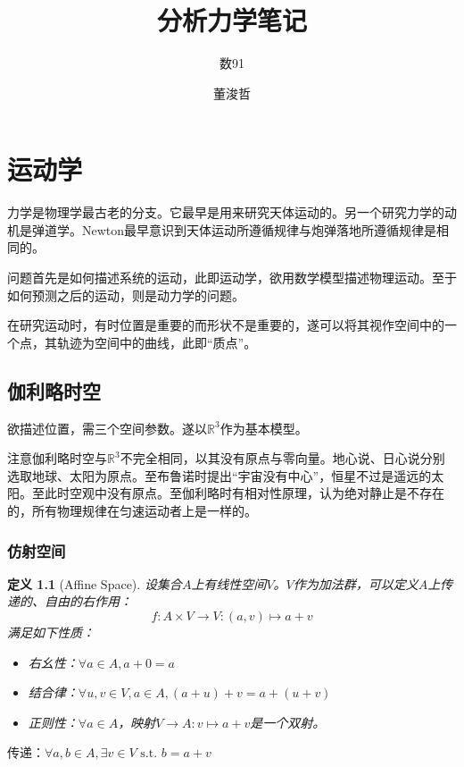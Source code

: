 \documentclass{ctexbook}
\title{分析力学笔记}
\author{数91\and 董浚哲}
\begin{document}
\maketitle

\newcommand{\A}{\mathbb{A}}
\newcommand{\R}{\mathbb{R}}
\newcommand{\N}{\mathbb{N}}
\newcommand{\dd}{\,\mathrm{d}}
\newcommand{\st}{\text{ s.t. }}
\newcommand{\pp}[2]{\frac{\partial #1}{\partial #2}}
\newcommand{\dif}[2]{\frac{\mathrm{d}#1}{\mathrm{d}#2}}
\newcommand{\nm}[1]{\left\|#1\right\|}
\newcommand{\dual}[1]{\left<#1\right>}
\newcommand{\wto}{\rightharpoonup}
\newcommand{\wsto}{\stackrel{*}{\rightharpoonup}}
\newcommand{\cvin}{\text{ in }}
\newcommand{\alev}{\text{ a.e. }}

\newtheorem{Thm}{定理}[section]
\newtheorem{Lemma}[Thm]{引理}
\newtheorem{Prop}[Thm]{命题}
\newtheorem{Cor}[Thm]{推论}
\newtheorem{Def}{定义}[section]
\newtheorem{Rmk}{注}[section]
\newtheorem{Eg}{例}[section]

\chapter{运动学}
力学是物理学最古老的分支。它最早是用来研究天体运动的。另一个研究力学的动机是弹道学。Newton最早意识到天体运动所遵循规律与炮弹落地所遵循规律是相同的。

问题首先是如何描述系统的运动，此即运动学，欲用数学模型描述物理运动。至于如何预测之后的运动，则是动力学的问题。

在研究运动时，有时位置是重要的而形状不是重要的，遂可以将其视作空间中的一个点，其轨迹为空间中的曲线，此即“质点”。

\section{伽利略时空}
欲描述位置，需三个空间参数。遂以$\R^{3}$作为基本模型。

注意伽利略时空与$\R^{3}$不完全相同，以其没有原点与零向量。地心说、日心说分别选取地球、太阳为原点。至布鲁诺时提出“宇宙没有中心”，恒星不过是遥远的太阳。至此时空观中没有原点。至伽利略时有相对性原理，认为绝对静止是不存在的，所有物理规律在匀速运动者上是一样的。

\subsection{仿射空间}
\begin{Def}[Affine Space]
  设集合$A$上有线性空间$V$。$V$作为加法群，可以定义$A$上传递的、自由的右作用：
  \[f:A\times V\to V:(a,v)\mapsto a+v\]
  满足如下性质：
  \begin{itemize}
  \item 右幺性：$\forall a\in A,a+0=a$
  \item 结合律：$\forall u,v\in V,a\in A,(a+u)+v=a+(u+v)$
  \item 正则性：$\forall a\in A$，映射$V\to A:v\mapsto a+v$是一个双射。
  \end{itemize}
 
\end{Def}
 传递：$\forall a,b\in A,\exists v\in V\st b=a+v$
\end{document}
